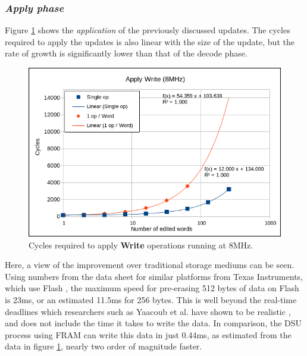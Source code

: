 \subsubsection*{\textbf{\textit{Apply phase}}}
Figure \ref{fig:wApply8} shows the \textit{application} of the previously discussed updates. The cycles required to apply the updates is also linear with the size of the update, but the rate of growth is significantly lower than that of the decode phase.
\begin{figure}[!ht]
    \begin{shaded}
        \centering
        \includegraphics[width=\figurewidth]{img/wApply8.png}
        \caption{Cycles required to apply \textbf{Write} operations running at 8MHz.}
        \label{fig:wApply8}
    \end{shaded}
\end{figure}
Here, a view of the improvement over traditional storage mediums can be seen. Using numbers from the data sheet for similar platforms from Texas Instruments, which use Flash \cite{msp430Flash}, the maximum speed for pre-erasing 512 bytes of data on Flash is 23ms, or an estimated 11.5ms for 256 bytes. This is well beyond the real-time deadlines which researchers such as Yaacoub et al. have shown to be realistic \cite{NeRTA}, and does not include the time it takes to write the data. In comparison, the DSU process using FRAM can write this data in just 0.44ms, as estimated from the data in figure \ref{fig:wApply8}, nearly two order of magnitude faster.

